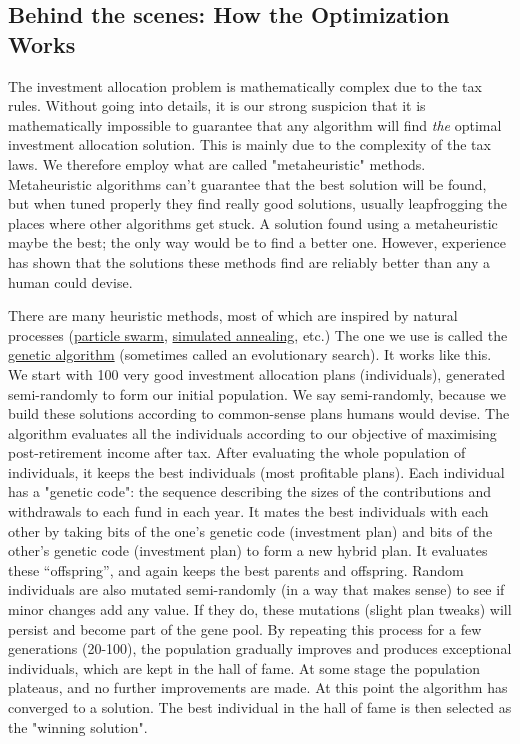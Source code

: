 \documentclass[a4paper, justified]{tufte-handout}
\begin{document}
\subsection{Behind  the scenes: How the Optimization Works}

The investment allocation problem is mathematically complex due to the tax rules. Without going into details, it is our strong suspicion that it is mathematically impossible to guarantee that any algorithm will find \textit{the} optimal investment allocation solution. This is mainly due to the complexity of the tax laws. We therefore employ what are called "metaheuristic" methods. Metaheuristic algorithms can't guarantee that the best solution will be found, but when tuned properly they find really good solutions, usually leapfrogging the places where other algorithms get stuck. A solution found using a metaheuristic maybe the best; the only way would be to find a better one. However, experience has shown that the solutions these methods find are reliably better than any a human could devise.

There are many heuristic methods, most of which are inspired by natural processes (\href{https://en.wikipedia.org/wiki/Particle_swarm_optimization}{particle swarm}, \href{https://en.wikipedia.org/wiki/Simulated_annealing}{simulated annealing}, etc.) The one we use is called the \href{https://en.wikipedia.org/wiki/Genetic_algorithm}{genetic algorithm} (sometimes called an evolutionary search). It works like this. We start with 100 very good investment allocation plans (individuals), generated semi-randomly to form our initial population. We say semi-randomly, because we build these solutions according to common-sense plans humans would devise. The algorithm evaluates all the individuals according to our objective of maximising post-retirement income after tax. After evaluating the whole population of individuals, it keeps the best individuals (most profitable plans). Each individual has a "genetic code": the sequence describing the sizes of the contributions and withdrawals to each fund in each year. It mates the best individuals with each other by taking bits of the one's genetic code (investment plan) and bits of the other's genetic code (investment plan) to form a new hybrid plan. It evaluates these ``offspring'', and again keeps the best parents and offspring. Random individuals are also mutated semi-randomly (in a way that makes sense) to see if minor changes add any value. If they do, these mutations (slight plan tweaks) will persist and become part of the gene pool. By repeating this process for a few generations (20-100), the population gradually improves and produces exceptional individuals, which are kept in the hall of fame. At some stage the population plateaus, and no further improvements are made. At this point the algorithm has converged to a solution. The best individual in the hall of fame is then selected as the "winning solution".
\end{document}
